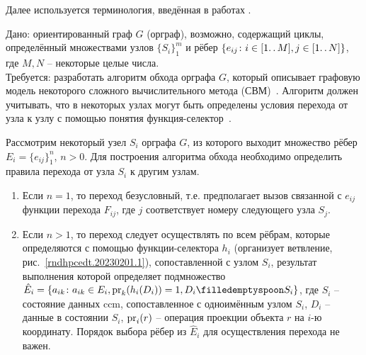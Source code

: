 \def\notedate{2023.02.01}
\def\currentauthor{Журавлев Н.В. (РК6-72Б), Соколов А.П.}

Далее используется терминология, введённая в работах \cite{SokPersh2019PCS, SokGolub2021GBSEBL}.  

\begin{task}
Дано: ориентированный граф $G$ (орграф), возможно, содержащий циклы, определённый множествами узлов $\{S_i\}_1^m$ и рёбер $\{e_{ij}\colon i\in[1\ldotp\ldotp M], j\in[1\ldotp\ldotp N]\}$, где $M,N$ -- некоторые целые числа.\\
Требуется: разработать алгоритм обхода орграфа $G$, который описывает графовую модель некоторого сложного вычислительного метода (СВМ)~\cite{SokPersh2019PCS}. Алгоритм должен учитывать, что в некоторых узлах могут быть определены условия перехода от узла к узлу с помощью понятия функция-селектор~\cite{SokGolub2021GBSEBL}.
\end{task}

Рассмотрим некоторый узел $S_i$ орграфа $G$, из которого выходит множество рёбер $E_i=\{e_{ij}\}_1^n$, $n>0$. Для построения алгоритма обхода необходимо определить правила перехода от узла $S_{i}$ к другим узлам.
\begin{enumerate}
  \item Если $n=1$, то переход безусловный, т.е. предполагает вызов связанной с $e_{ij}$ функции перехода $F_{ij}$, где $j$ соответствует номеру следующего узла $S_j$.
  \item Если $n>1$, то переход следует осуществлять по всем рёбрам, которые определяются с помощью функции-селектора $h_i$ (организует ветвление, рис.~\ref{rndhpcedt.20230201.1}), сопоставленной с узлом $S_i$, результат выполнения которой определяет подмножество $\hat{E}_i=\{a_{ik}\colon {a_{ik}\in E_i}, {\pr_k(h_i(D_i))=1}, {D_i \filledemptyspoon S_i}\}$, где $S_i$ -- состояние данных \gls{ccm}, сопоставленное с одноимённым узлом $S_{i}$, $D_i$ -- данные в состоянии $S_i$, $\mbox{pr}_{i}(r)$ -- операция проекции объекта $r$ на $i$-ю координату. Порядок выбора рёбер из $\hat{E}_i$ для осуществления перехода не важен.
\end{enumerate}

